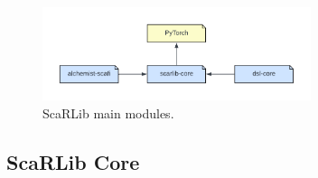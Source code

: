 \documentclass[12pt,a4paper,openright,twoside]{book}
\begin{document}
\begin{figure}
    \centering
    \includegraphics[width=0.7\textwidth]{figures/scarlib-modules.pdf}
    \caption{ScaRLib main modules.}
    \label{fig:mainmodules}
\end{figure}

\subsection*{ScaRLib Core}
\end{document}
